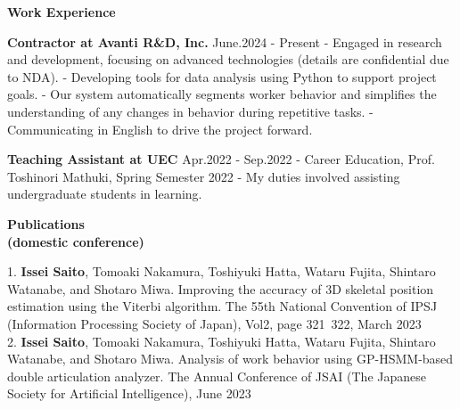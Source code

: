\documentclass[a4paper,10pt]{article}
\begin{document}
\noindent
\begin{minipage}[t]{0.3\textwidth}
    \textbf{Work Experience}
\end{minipage}%
\begin{minipage}[t]{0.7\textwidth}
    \textbf{Contractor at Avanti R\&D, Inc.}  \hfill June.2024 - Present \newline
    - Engaged in research and development, focusing on advanced technologies (details are confidential due to NDA).\newline
    - Developing tools for data analysis using Python to support project goals.\newline
    - Our system automatically segments worker behavior and simplifies the understanding of any changes in behavior during repetitive tasks. \newline
    - Communicating in English to drive the project forward. \newline 

    \textbf{Teaching Assistant at UEC}  \hfill Apr.2022 - Sep.2022 \newline
    - Career Education, Prof. Toshinori Mathuki, Spring Semester 2022\newline
    - My duties involved assisting undergraduate students in learning. \newline
\end{minipage}

\vspace{10pt}

\noindent
\begin{minipage}[t]{0.3\textwidth}
    \textbf{Publications \\(domestic conference)}
\end{minipage}%
\begin{minipage}[t]{0.7\textwidth}
    1.  \textbf{Issei Saito}, Tomoaki Nakamura, Toshiyuki Hatta, Wataru Fujita, Shintaro Watanabe, and Shotaro Miwa. Improving the accuracy of 3D skeletal position estimation using the Viterbi algorithm. The 55th National Convention of IPSJ (Information Processing Society of Japan), Vol2, page 321~322, March 2023 \newline \\
    2. \textbf{Issei Saito}, Tomoaki Nakamura, Toshiyuki Hatta, Wataru Fujita, Shintaro Watanabe, and Shotaro Miwa. Analysis of work behavior using GP-HSMM-based double articulation analyzer. The Annual Conference of JSAI (The Japanese Society for Artificial Intelligence), June 2023 \newline
\end{minipage}
\end{document}
